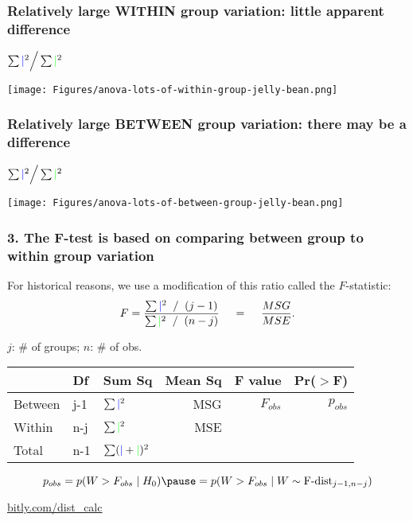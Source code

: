 \documentclass[11pt,containsverbatim,handout,xcolor=xelatex,dvipsnames,table]{beamer}
\begin{document}
\begin{frame}
\frametitle{Relatively large WITHIN group variation: little apparent difference}

\centering
\(
\sum {\color{blue} \mid}^2 \Big/ \sum {\color{green} \mid}^2
\)

    \texttt{[image: Figures/anova-lots-of-within-group-jelly-bean.png]}

\end{frame}

\begin{frame}
\frametitle{Relatively large BETWEEN group variation: there may be a difference}

\centering
\(
\sum {\color{blue} \mid}^2 \Big/ \sum {\color{green} \mid}^2
\)
    
    \texttt{[image: Figures/anova-lots-of-between-group-jelly-bean.png]}

\end{frame}


\begin{frame}
  \frametitle{3. The F-test is based on comparing between group to within group variation}

For historical reasons, we use a modification of this ratio called the $F$-statistic:
\[
F = \frac{\sum {\color{blue} \mid}^2 \; \; / \; \; (j-1)}{\sum {\color{green} \mid}^2 \; \; / \; \; (n-j)}
\hspace{12pt} = \hspace{12pt} \frac{MSG}{MSE}.
\]

$j$: \# of groups; $n$: \# of obs.

\pause

\begin{center}
\small
\begin{tabular}{lllrrr}
  \hline
  & Df  & Sum Sq & Mean Sq & F value & Pr($>$F) \\ 
  \hline
  Between & j-1 & $\sum {\color{blue}\mid}^2$  & MSG & $F_{obs}$ & $p_{obs}$ \\ 
  Within  & n-j & $\sum {\color{green}\mid}^2$ & MSE &		 &  \\ 
   \hline
Total			& n-1 & $\sum ({\color{blue}\mid} + {\color{green}\mid})^2$    &                &                &
\end{tabular}
\end{center}

\pause

\[
p_{obs} = p(W > F_{obs} \mid H_0) \pause = p(W > F_{obs} \mid W \sim \textmd{F-dist}_{j-1, n-j})
\]

\centering
\url{bitly.com/dist_calc}

\end{frame}
\end{document}
